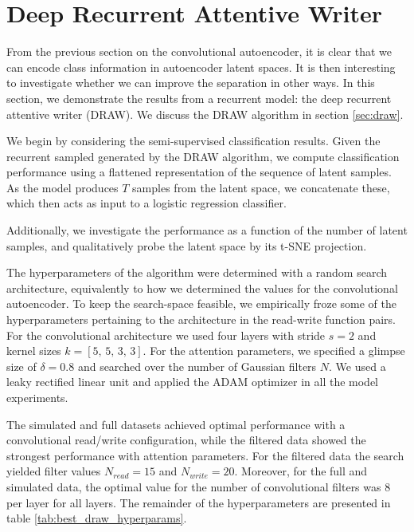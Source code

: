 \section{Deep Recurrent Attentive Writer }

From the previous section on the convolutional autoencoder, it is clear that we can encode class information in autoencoder latent spaces. It is then interesting to investigate whether we can improve the separation in other ways. In this section, we demonstrate the results from a recurrent model: the deep recurrent attentive writer (DRAW). We discuss the DRAW algorithm in section \ref{sec:draw}.

We begin by considering the semi-supervised classification results. Given the recurrent sampled generated by the DRAW algorithm, we compute classification performance using a flattened representation of the sequence of latent samples. As the model produces $T$ samples from the latent space, we concatenate these, which then acts as input to a logistic regression classifier.

Additionally, we investigate the performance as a function of the number of latent samples, and qualitatively probe the latent space by its t-SNE projection.

The hyperparameters of the algorithm were determined with a random search architecture, equivalently to how we determined the values for the convolutional autoencoder. To keep the search-space feasible, we empirically froze some of the hyperparameters pertaining to the architecture in the read-write function pairs. For the convolutional architecture we used four layers with stride $s=2$ and kernel sizes $k= [5,\, 5,\, 3,\, 3]$. For the attention parameters, we specified a glimpse size of $\delta=0.8$ and searched over the number of Gaussian filters $N$. We used a leaky rectified linear unit and applied the ADAM optimizer in all the model experiments.

The simulated and full datasets achieved optimal performance with a convolutional read/write configuration, while the filtered data showed the strongest performance with attention parameters. For the filtered data the search yielded filter values $N_{read} = 15$ and $N_{write}=20$. Moreover, for the full and simulated data, the optimal value for the number of convolutional filters was $8$ per layer for all layers. The remainder of the hyperparameters are presented in table \ref{tab:best_draw_hyperparams}.


